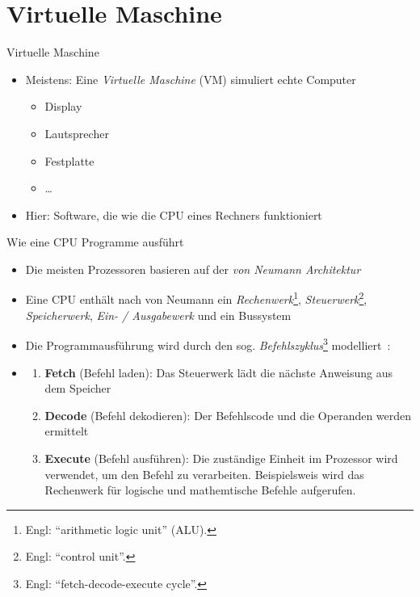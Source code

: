 \section{Virtuelle Maschine}

\begin{frame}{Virtuelle Maschine}
	\begin{itemize}
		\item Meistens: Eine \emph{Virtuelle Maschine} (VM) simuliert echte Computer
		      \begin{itemize}
			      \item Display
			      \item Lautsprecher
			      \item Festplatte
			      \item \dots
		      \end{itemize}
		\item Hier: Software, die wie die CPU eines Rechners funktioniert
	\end{itemize}
\end{frame}

\begin{frame}{Wie eine CPU Programme ausführt }
	\begin{itemize}
		\item Die meisten Prozessoren basieren auf der \emph{von Neumann Architektur}~
		\item Eine CPU enthält nach von Neumann ein \emph{Rechenwerk}\footnote{Engl: \enquote{arithmetic logic unit} (ALU).}, \emph{Steuerwerk}\footnote{Engl: \enquote{control unit}.}, \emph{Speicherwerk}, \emph{Ein- / Ausgabewerk} und ein Bussystem~
		\item Die Programmausführung wird durch den sog. \emph{Befehlszyklus}\footnote{Engl: \enquote{fetch-decode-execute cycle}.} modelliert~:
		\item[] \begin{enumerate}
				\item \textbf{Fetch} (Befehl laden): Das Steuerwerk lädt die nächste Anweisung aus dem Speicher
				\item \textbf{Decode} (Befehl dekodieren): Der Befehlscode und die Operanden werden ermittelt
				\item \textbf{Execute} (Befehl ausführen): Die zuständige Einheit im Prozessor wird verwendet, um den Befehl zu verarbeiten.
				      Beispielsweis wird das Rechenwerk für logische und mathemtische Befehle aufgerufen.
			\end{enumerate}
	\end{itemize}
\end{frame}

